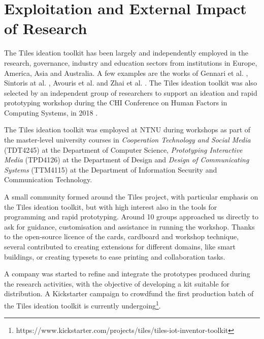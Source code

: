 \section{Exploitation and External Impact of Research}
\label{sec:exploitation}

The Tiles ideation toolkit has been largely and independently employed in the research, governance, industry and education sectors from institutions in Europe, America, Asia and Australia.
A few examples are the works of 
Gennari et al. \autocite*{gennari_design_2017}, Sintoris at al. \autocite*{sintoris_out_2018}, Avouris et al. \autocite*{avouris_designing_2018} and  Zhai et al. \autocite*{zhai_co-sleep_2018}. The Tiles ideation toolkit was also selected by an independent group of researchers to support an ideation and rapid prototyping workshop during the CHI Conference on Human Factors in Computing Systems, in 2018 \autocite{angelini_internet_2018-1}.

The Tiles ideation toolkit was employed at NTNU during workshops as part of the master-level university courses in \textit{Cooperation Technology and Social Media} (TDT4245) at the Department of Computer Science, \textit{Prototyping Interactive Media} (TPD4126) at the Department of Design and \textit{Design of Communicating Systems} (TTM4115) at the Department of Information Security and Communication Technology.

A small community formed around the Tiles project, with particular emphasis on the Tiles ideation toolkit, but with high interest also in the tools for programming and rapid prototyping. Around 10 groups approached us directly to ask for guidance, customisation and assistance in running the workshop. Thanks to the open-source licence of the cards, cardboard and workshop technique, several contributed to creating extensions for different domains, like smart buildings, or creating typesets to ease printing and collaboration tasks.

A company was started to refine and integrate the prototypes produced during the research activities, with the objective of developing a kit suitable for distribution.
A Kickstarter campaign to crowdfund the first production batch of the Tiles ideation toolkit is currently undergoing\footnote{https://www.kickstarter.com/projects/tiles/tiles-iot-inventor-toolkit}.
